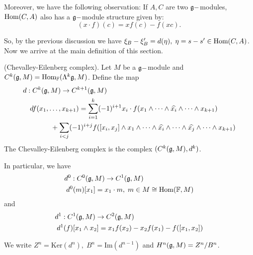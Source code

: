 \begin{itemize}
Moreover, we have the following observation: If $A,C$ are two $\mathfrak{g}-$modules, $\text{Hom}(C,A)$ also has 
a $\mathfrak{g}-$module structure given by:
\begin{equation}
    (x\cdot f)(c)=xf(c)-f(xc).
\end{equation} 

So, by the previous discussion we have $\xi_B-\xi_B^\prime=d(\eta),\;\eta=s-s^\prime\in\text{Hom}(C,A)$. 
Now we arrive at the main definition of this section.

\begin{dang}
    \begin{definition}
        (Chevalley-Eilenberg complex). Let $M$ be a $\mathfrak{g}-$module and 
        $C^k(\mathfrak{g},M)=\text{Hom}_{\mathbb{F}}(\Lambda^k\mathfrak{g},M)$. Define the map 
        \begin{equation}
            \begin{split}
                &d: C^k(\mathfrak{g},M)\to C^{k+1}(\mathfrak{g},M)\\
                &\quad df(x_1,\dots,x_{k+1})=
                \sum_{i=1}^k (-1)^{i+1} x_i\cdot f(x_1\wedge\cdots\wedge\widehat{x_i}\wedge\cdots\wedge x_{k+1})\\
                &\quad\quad\quad\quad +\sum_{i<j}(-1)^{i+j}
                f([x_i,x_j]\wedge x_1\wedge\cdots \wedge\widehat{x_i}\wedge\cdots\wedge\widehat{x_j}\wedge\cdots\wedge x_{k+1})
            \end{split}
        \end{equation}
        The Chevalley-Eilenberg complex is the complex $(C^k(\mathfrak{g},M),d^k)$.
    \end{definition}
\end{dang}

In particular, we have 
\begin{equation}
    \begin{split}
        &d^0: C^0(\mathfrak{g},M)\to C^1(\mathfrak{g},M)\\
        &\;d^0(m)[x_1]=x_1\cdot m,\;m\in M\cong\text{Hom}(\mathbb{F},M)
    \end{split}
\end{equation}
and 
\begin{equation}
    \begin{split}
        &d^1:C^1(\mathfrak{g},M)\to C^2(\mathfrak{g},M)\\
    &\;d^1(f)[x_1\wedge x_2]=x_1f(x_2)-x_2f(x_1)-f([x_1,x_2])
    \end{split}
\end{equation}
\begin{dang}
    \begin{definition}
        We write $Z^n=\text{Ker}(d^n),\;B^n=\text{Im}(d^{n-1})$ and $H^n(\mathfrak{g},M)=Z^n/B^n$.
    \end{definition}
\end{dang}


\end{itemize}
